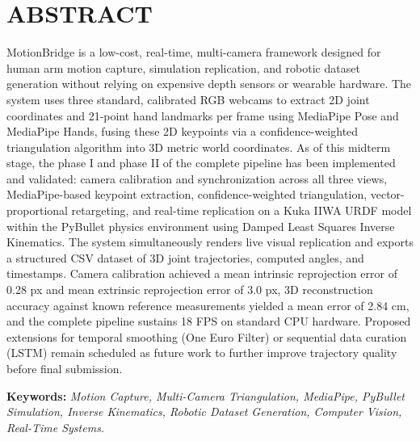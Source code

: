 \chapter*{ABSTRACT}
{}
MotionBridge is a low-cost, real-time, multi-camera framework designed for human arm motion capture, simulation replication, and robotic dataset generation without relying on expensive depth sensors or wearable hardware. The system uses three standard, calibrated RGB webcams to extract 2D joint coordinates and 21-point hand landmarks per frame using MediaPipe Pose and MediaPipe Hands, fusing these 2D keypoints via a confidence-weighted triangulation algorithm into 3D metric world coordinates. As of this midterm stage, the phase I and phase II of the complete pipeline has been implemented and validated: camera calibration and synchronization across all three views, MediaPipe-based keypoint extraction, confidence-weighted triangulation, vector-proportional retargeting, and real-time replication on a Kuka IIWA URDF model within the PyBullet physics environment using Damped Least Squares Inverse Kinematics. The system simultaneously renders live visual replication and exports a structured CSV dataset of 3D joint trajectories, computed angles, and timestamps. Camera calibration achieved a mean intrinsic reprojection error of 0.28 px and mean extrinsic reprojection error of 3.0 px, 3D reconstruction accuracy against known reference measurements yielded a mean error of 2.84 cm, and the complete pipeline sustains 18 FPS on standard CPU hardware. Proposed extensions for temporal smoothing (One Euro Filter) or sequential data curation (LSTM) remain scheduled as future work to further improve trajectory quality before final submission.


\vspace{1em}

\textbf{Keywords:}\textit{ Motion Capture, Multi-Camera Triangulation, MediaPipe, PyBullet Simulation, Inverse Kinematics, Robotic Dataset Generation, Computer Vision, Real-Time Systems.}
